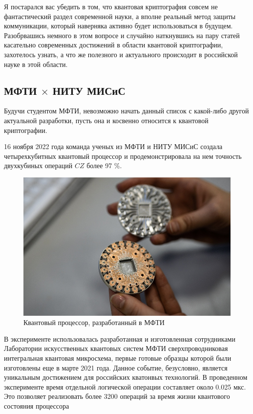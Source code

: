 Я постарался вас убедить в том, что квантовая криптография совсем не фантастический раздел современной науки, а вполне реальный метод защиты коммуникации, который наверняка активно будет использоваться в будущем.
Разобрвашись немного в этом вопросе и случайно наткнувшись на пару статей касательно современных достижений в области квантовой криптографии, захотелось узнать, а что же полезного и актуального происходит в российской науке в этой области.

\subsection{МФТИ $\times$ НИТУ МИСиС}

Будучи студентом МФТИ, невозможно начать данный список с какой-либо другой актуальной разработки, пусть она и косвенно относится к квантовой криптографии.  

16 ноября 2022 года команда ученых из МФТИ и НИТУ МИСиС создала четырехкубитных квантовый процессор и продемонстрировала на нем точность двухкубиных операций $CZ$ более 97 \%.

\begin{figure}[h!]
    \centering
    \includegraphics[width=0.8\linewidth]{pics/quantum_processor.jpg}
    \caption{Квантовый процессор, разработанный в МФТИ}
    \label{missis_lab}
\end{figure}

В эксперименте использовалась разработанная и изготовленная сотрудниками Лаборатории искусственных квантовых систем МФТИ сверхпроводниковая интегральная квантовая микросхема, первые готовые образцы которой были изготовлены еще в марте 2021 года. Данное событие, безусловно, является уникальным достижением для российских кватонвых технологий. 
В проведенном эксперименте время отдельной логической операции составляет около 0.025 мкс. Это позволяет реализовать более 3200 операций за время жизни квантового состояния процессора 

